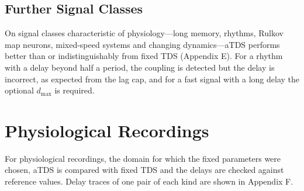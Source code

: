 \documentclass[11pt,a4paper]{article}
\begin{document}
\begin{table}[t]
\centering
\caption{Delay patterns, 40 coupled pairs and 40 controls each, fixed TDS / aTDS. Stable: \% of windows stable in coupled pairs (on/off: inside coupled blocks). Accurate: \% of stable windows with $-\tau_0$ within 3 samples of $d(t)$. False stable: \% of windows stable in controls. AUC on the whole-record score.}
\label{tab:patterns}
\footnotesize
\setlength{\tabcolsep}{4pt}
\end{table}

\subsection{Further Signal Classes}
On signal classes characteristic of physiology---long memory, rhythms, Rulkov map neurons, mixed-speed systems and changing dynamics---aTDS performs better than or indistinguishably from fixed TDS (Appendix E). For a rhythm with a delay beyond half a period, the coupling is detected but the delay is incorrect, as expected from the lag cap, and for a fast signal with a long delay the optional $d_{\max}$ is required.


\section{Physiological Recordings}
\label{sec:realdata}
\label{sec:res-physio}
For physiological recordings, the domain for which the fixed parameters were chosen, aTDS is compared with fixed TDS and the delays are checked against reference values. Delay traces of one pair of each kind are shown in Appendix F.
\end{document}
